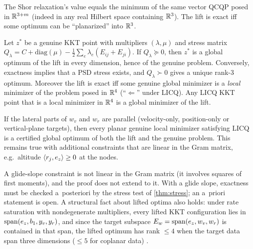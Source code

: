 \begin{lemma}[Shor lift = Hilbert-sphere problem {\pnote{math/08 Lemma~1.1}}]\label{lem:shor}
The Shor relaxation's value equals the minimum of the same vector QCQP posed in $\mathbb{R}^{3+m}$ (indeed in any real Hilbert space
containing $\mathbb{R}^3$). The lift is exact iff some optimum can be ``planarized'' into $\mathbb{R}^3$.\Sproved
\end{lemma}
\begin{theorem}\label{thm:stress}
Let $z^*$ be a genuine KKT point with multipliers $(\lambda,\mu)$ and stress matrix
$Q_\lambda=C+\mathrm{diag}(\mu)-\tfrac12\sum_e\lambda_e(E_{ij}+E_{ji})$. If $Q_\lambda\succeq0$, then $z^*$ is a global optimum of the lift
in every dimension, hence of the genuine problem. Conversely, exactness implies that a PSD stress exists, and
$Q_\lambda\succ0$ gives a unique rank-3 optimum. Moreover the lift is exact iff some genuine global minimizer is a \emph{local}
minimizer of the problem posed in $\mathbb{R}^4$ (``$\Leftarrow$'' under LICQ). Any LICQ KKT point that is a local minimizer in $\mathbb{R}^4$ is
a global minimizer of the lift.\Sproved
\end{theorem}
\begin{theorem}\label{thm:coplanar}
If the lateral parts of $w_v$ and $w_r$ are parallel (velocity-only, position-only or vertical-plane targets), then every
planar genuine local minimizer satisfying LICQ is a certified global optimum of both the lift and the genuine problem. This
remains true with additional constraints that are linear in the Gram matrix, e.g.\ altitude $\langle r_j,e_z\rangle\ge0$ at the nodes.\Srep
\end{theorem}
A glide-slope constraint is not linear in the Gram matrix (it involves squares of first moments), and the proof does not
extend to it. With a glide slope, exactness must be checked a~posteriori by the stress test of \cref{thm:stress}; an a~priori
statement is open. A structural fact about lifted optima also holds: under rate saturation with nondegenerate multipliers, every
lifted KKT configuration lies in $\mathrm{span}(e_z,b_1,y_v,y_r)$, and since the target subspace $E_w=\mathrm{span}(e_z,w_v,w_r)$ is
contained in that span, the lifted optimum has rank $\le4$ when the target data span three dimensions ($\le5$ for coplanar data)
\Srep.

